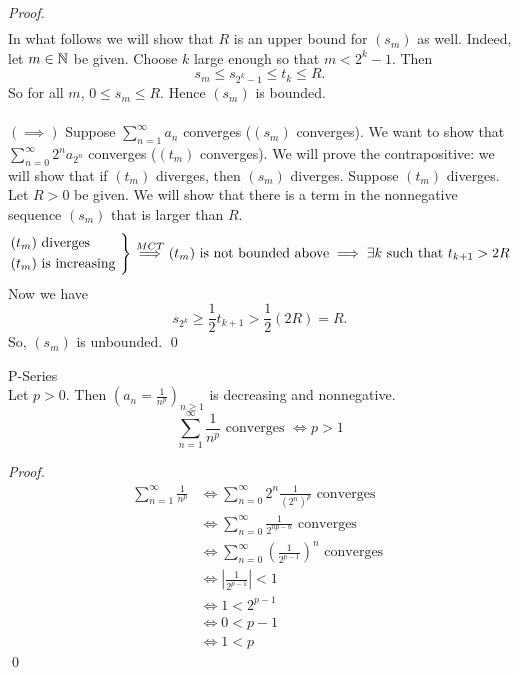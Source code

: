 \begin{proof}
\begin{align*}
    \end{align*}
    In what follows we will show that $R$ is an upper bound for $(s_m)$ as well. Indeed, let $m\in \mathbb{N}$ be given. Choose $k$ large enough so that $m < 2^k -1.$ Then
    $$s_m \leq s_{2^k - 1} \leq t_k \leq R.$$
    So for all $m$, $0 \leq s_m \leq R.$ Hence $(s_m)$ is bounded.
    \\ \\
    $(\implies)$ Suppose $\sum_{n=1}^{\infty}a_n$ converges ($(s_m)$ converges). We want to show that $\sum_{n=0}^{\infty} 2^n a_{2^n}$ converges ($(t_m)$ converges). We will prove the contrapositive: we will show that if $(t_m)$ diverges, then $(s_m)$ diverges. Suppose $(t_m)$ diverges. Let $R > 0$ be given. We will show that there is a term in the nonnegative sequence $(s_m)$ that is larger than $R$.
    $$
    \begin{rcases*}
        (t_m) \text{ diverges } \\
        (t_m) \text{ is increasing }
    \end{rcases*}
    \overset{MCT}{\implies} (t_m) \text{ is not bounded above} \implies \exists k \st t_{k+1} > 2R
    $$
    Now we have
    $$s_{2^k} \geq \frac{1}{2} t_{k+1} > \frac{1}{2}(2R) = R.$$
    So, $(s_m)$ is unbounded. \qed
\end{proof}

\begin{example} \leavevmode P-Series \\
    Let $p > 0$. Then $\left(a_n = \frac{1}{n^p}\right)_{n \geq 1}$ is decreasing and nonnegative.
    $$\sum_{n=1}^{\infty}\frac{1}{n^p} \text{ converges } \iff p > 1$$
\end{example}
\begin{proof}
    \begin{align*}
        \sum_{n=1}^{\infty} \frac{1}{n^p} &\iff \sum_{n=0}^{\infty} 2^n \frac{1}{(2^n)^p} \text{ converges } \\
        &\iff \sum_{n=0}^{\infty} \frac{1}{2^{np-n}} \text{ converges } \\
        &\iff \sum_{n=0}^{\infty} \left(\frac{1}{2^{p-1}}\right)^n \text{ converges } \\
        &\iff \left|\frac{1}{2^{p-1}}\right| < 1 \\
        &\iff 1 < 2^{p-1} \\
        &\iff 0 < p-1 \\
        &\iff 1 < p
    \end{align*} \qed
\end{proof}


